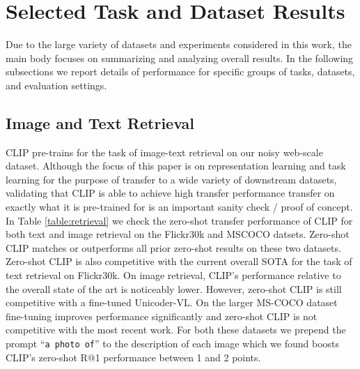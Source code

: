 \documentclass{article}
\begin{document}
\section{Selected Task and Dataset Results}
\label{appendix:selected}

Due to the large variety of datasets and experiments considered in this work, the main body focuses on summarizing and analyzing overall results. In the following subsections we report details of performance for specific groups of tasks, datasets, and evaluation settings.

\subsection{Image and Text Retrieval}

CLIP pre-trains for the task of image-text retrieval on our noisy web-scale dataset. Although the focus of this paper is on representation learning and task learning for the purpose of transfer to a wide variety of downstream datasets, validating that CLIP is able to achieve high transfer performance transfer on exactly what it is pre-trained for is an important sanity check / proof of concept. In Table \ref{table:retrieval} we check the zero-shot transfer performance of CLIP for both text and image retrieval on the Flickr30k and MSCOCO datsets. Zero-shot CLIP matches or outperforms all prior zero-shot results on these two datasets. Zero-shot CLIP is also competitive with the current overall SOTA for the task of text retrieval on Flickr30k. On image retrieval, CLIP's performance relative to the overall state of the art is noticeably lower. However, zero-shot CLIP is still competitive with a fine-tuned Unicoder-VL. On the larger MS-COCO dataset fine-tuning improves performance significantly and zero-shot CLIP is not competitive with the most recent work. For both these datasets we prepend the prompt ``\texttt{a photo of}'' to the description of each image which we found boosts CLIP's zero-shot R@1 performance between 1 and 2 points.
\end{document}
